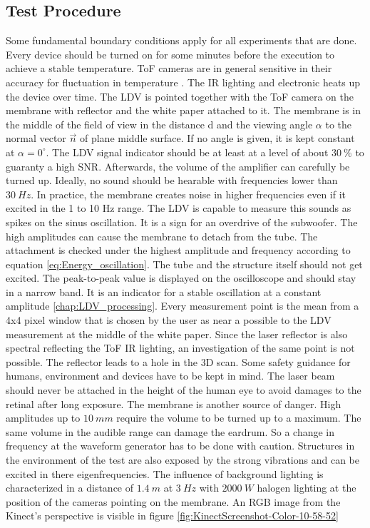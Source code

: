 \subsection{Test Procedure}
Some fundamental boundary conditions apply for all experiments that are done. Every device should be turned on for some minutes before the execution to achieve a stable temperature. ToF cameras are in general sensitive in their accuracy for fluctuation in temperature \cite{foix2011lock}. The IR lighting and electronic heats up the device over time. The LDV is pointed together with the ToF camera on the membrane with reflector and the white paper attached to it. The membrane is in the middle of the field of view in the distance d and the viewing angle $\alpha$ to the normal vector $\vec{n}$ of plane middle surface. If no angle is given, it is kept constant at $\alpha = 0^\circ$. The LDV signal indicator should be at least at a level of about $30~\%$ to guaranty a high SNR. Afterwards, the volume of the amplifier can carefully be turned up. Ideally, no sound should be hearable with frequencies lower than $30~Hz$. In practice, the membrane creates noise in higher frequencies even if it excited in the 1 to 10 Hz range. The LDV is capable to measure this sounds as spikes on the sinus oscillation. It is a sign for an overdrive of the subwoofer. The high amplitudes can cause the membrane to detach from the tube. The attachment is checked under the highest amplitude and frequency according to equation \ref{eq:Energy_oscillation}. The tube and the structure itself should not get excited. The peak-to-peak value is displayed on the oscilloscope and should stay in a narrow band. It is an indicator for a stable oscillation at a constant amplitude \ref{chap:LDV_processing}. Every measurement point is the mean from a 4x4 pixel window that is chosen by the user as near a possible to the LDV measurement at the middle of the white paper. Since the laser reflector is also spectral reflecting the ToF IR lighting, an investigation of the same point is not possible. The reflector leads to a hole in the 3D scan. Some safety guidance for humans, environment and devices have to be kept in mind. The laser beam should never be attached in the height of the human eye to avoid damages to the retinal after long exposure. The membrane is another source of danger. High amplitudes up to $10~mm$ require the volume to be turned up to a maximum. The same volume in the audible range can damage the eardrum. So a change in frequency at the waveform generator has to be done with caution. Structures in the environment of the test are also exposed by the strong vibrations and can be excited in there eigenfrequencies. The influence of background lighting is characterized in a distance of $1.4~m$ at $3~Hz$ with $2000~W$ halogen lighting at the position of the cameras pointing on the membrane. An RGB image from the Kinect's perspective is visible in figure \ref{fig:KinectScreenshot-Color-10-58-52}\\


